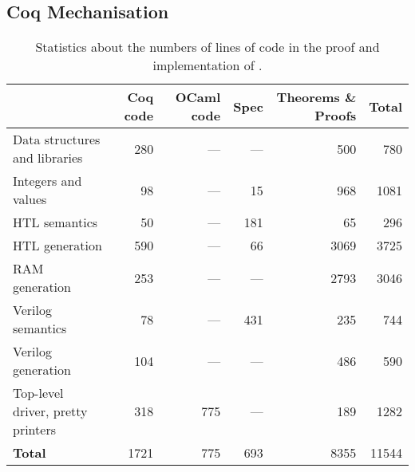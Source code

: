 \subsection{Coq Mechanisation}

\begin{table}
  \centering
  \caption{Statistics about the numbers of lines of code in the proof and implementation of \vericert{}.}\label{tab:proof_statistics}
  \begin{tabular}{lrrrrr}
    \toprule
    & \textbf{Coq code} & \multicolumn{1}{p{1cm}}{\raggedleft\textbf{OCaml code}} & \textbf{Spec} & \multicolumn{1}{p{2cm}}{\raggedleft\textbf{Theorems \& Proofs}} & \textbf{Total}\\
    \midrule
    {Data structures and libraries}     & 280  & --- & ---  & 500  & 780   \\
    {Integers and values}               & 98   & --- & 15   & 968  & 1081  \\
    {HTL semantics}                     & 50   & --- & 181  & 65   & 296   \\
    {HTL generation}                    & 590  & --- & 66   & 3069 & 3725  \\
    {RAM generation}                    & 253  & --- & ---  & 2793 & 3046  \\
    {Verilog semantics}                 & 78   & --- & 431  & 235  & 744   \\
    {Verilog generation}                & 104  & --- & ---  & 486  & 590   \\
    {Top-level driver, pretty printers} & 318  & 775 & ---  & 189  & 1282  \\
    \midrule
    \textbf{Total}                      & 1721 & 775 & 693  & 8355 & 11544 \\
    \bottomrule
  \end{tabular}
\end{table}

